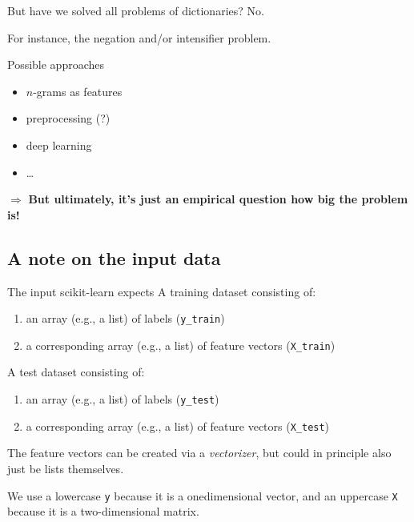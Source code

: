 \begin{frame}{But have we solved all problems of dictionaries?}
	No.
	
	For instance, the negation and/or intensifier problem.
	
	Possible approaches
	\begin{itemize}
		\item $n$-grams as features
		\item preprocessing (?)
		\item deep learning 
		\item \ldots
	\end{itemize}
	\pause
	
	$\Rightarrow$ \textbf{But ultimately, it's just an empirical question how big the problem is!}
	
	
\end{frame}


\subsection{A note on the input data}

\begin{frame}{The input scikit-learn expects}
	A training dataset consisting of:
	\begin{enumerate}
		\item an array (e.g., a list) of labels (\texttt{y\_train})
		\item a corresponding array (e.g., a list) of feature vectors (\texttt{X\_train})
	\end{enumerate}
	
	A test dataset consisting of:
	\begin{enumerate}
		\item an array (e.g., a list) of labels (\texttt{y\_test})
		\item a corresponding array (e.g., a list) of feature vectors (\texttt{X\_test})
	\end{enumerate}
	
	The feature vectors can be created via a \textit{vectorizer}, but could in principle also just be lists themselves.
	
	We use a lowercase \texttt{y} because it is a onedimensional vector, and an uppercase \texttt{X} because it is a two-dimensional matrix.
\end{frame}


